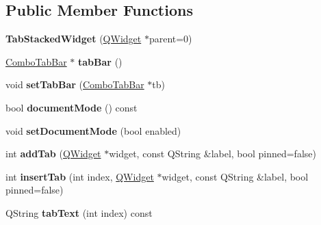 \subsection*{Public Member Functions}
\begin{DoxyCompactItemize}
\item 
\hypertarget{class_tab_stacked_widget_af74e31a77c3b4fc04a8444ac3c8a2f14}{
{\bfseries TabStackedWidget} (\hyperlink{class_q_widget}{QWidget} $\ast$parent=0)}
\label{class_tab_stacked_widget_af74e31a77c3b4fc04a8444ac3c8a2f14}

\item 
\hypertarget{class_tab_stacked_widget_a354c44a4559ef1c7d40672cd7de5c45c}{
\hyperlink{class_combo_tab_bar}{ComboTabBar} $\ast$ {\bfseries tabBar} ()}
\label{class_tab_stacked_widget_a354c44a4559ef1c7d40672cd7de5c45c}

\item 
\hypertarget{class_tab_stacked_widget_a61e38c15cd94e9a26c2fbfaea33f1f68}{
void {\bfseries setTabBar} (\hyperlink{class_combo_tab_bar}{ComboTabBar} $\ast$tb)}
\label{class_tab_stacked_widget_a61e38c15cd94e9a26c2fbfaea33f1f68}

\item 
\hypertarget{class_tab_stacked_widget_a16e2efde830506e8d5d7e4c7cc051d38}{
bool {\bfseries documentMode} () const }
\label{class_tab_stacked_widget_a16e2efde830506e8d5d7e4c7cc051d38}

\item 
\hypertarget{class_tab_stacked_widget_a5664687a2ebd33508410362764f587a3}{
void {\bfseries setDocumentMode} (bool enabled)}
\label{class_tab_stacked_widget_a5664687a2ebd33508410362764f587a3}

\item 
\hypertarget{class_tab_stacked_widget_a763e40673682bdfaebd518008a58f1a1}{
int {\bfseries addTab} (\hyperlink{class_q_widget}{QWidget} $\ast$widget, const QString \&label, bool pinned=false)}
\label{class_tab_stacked_widget_a763e40673682bdfaebd518008a58f1a1}

\item 
\hypertarget{class_tab_stacked_widget_ab2a2466ef7ae88f9813f473e6452bd00}{
int {\bfseries insertTab} (int index, \hyperlink{class_q_widget}{QWidget} $\ast$widget, const QString \&label, bool pinned=false)}
\label{class_tab_stacked_widget_ab2a2466ef7ae88f9813f473e6452bd00}

\item 
\hypertarget{class_tab_stacked_widget_a72e1cf12a94bba3216b318efa39d0b09}{
QString {\bfseries tabText} (int index) const }
\label{class_tab_stacked_widget_a72e1cf12a94bba3216b318efa39d0b09}


\end{DoxyCompactItemize}
